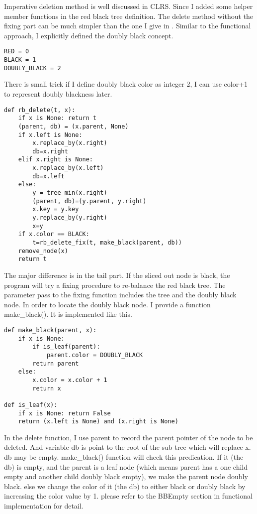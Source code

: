 \documentclass{article}
\begin{document}
Imperative deletion method is well discussed in CLRS. Since I added some helper member functions
in the red black tree definition. The delete method without the fixing part can be much simpler
than the one I give in \cite{bst-lxy}. Similar to the functional approach, I explicitly defined
the doubly black concept.

\lstset{language=Python}
\begin{lstlisting}
RED = 0
BLACK = 1
DOUBLY_BLACK = 2
\end{lstlisting}

There is small trick if I define doubly black color as integer 2, I can use color+1 to represent
doubly blackness later.

\lstset{language=Python}
\begin{lstlisting}
def rb_delete(t, x):
    if x is None: return t
    (parent, db) = (x.parent, None)
    if x.left is None:
        x.replace_by(x.right)
        db=x.right
    elif x.right is None:
        x.replace_by(x.left)
        db=x.left
    else:
        y = tree_min(x.right)
        (parent, db)=(y.parent, y.right)
        x.key = y.key
        y.replace_by(y.right)
        x=y
    if x.color == BLACK:
        t=rb_delete_fix(t, make_black(parent, db))
    remove_node(x)
    return t
\end{lstlisting}

The major difference is in the tail part. If the sliced out node is black, the program will
try a fixing procedure to re-balance the red black tree. The parameter pass to the fixing
function includes the tree and the doubly black node. In order to locate the doubly black
node. I provide a function make\_black(). It is implemented like this.

\begin{lstlisting}
def make_black(parent, x):
    if x is None:
        if is_leaf(parent):
            parent.color = DOUBLY_BLACK
        return parent
    else:
        x.color = x.color + 1
        return x

def is_leaf(x):
    if x is None: return False
    return (x.left is None) and (x.right is None)
\end{lstlisting}

In the delete function, I use parent to record the parent pointer of the node to be deleted. 
And variable db is point to the root of the sub tree which will replace x. db may be empty.
make\_black() function will check this predication. If it (the db) is empty, and the parent is a leaf
node (which means parent has a one child empty and another child doubly black empty), we make
the parent node doubly black. else we change the color of it (the db) to either black or doubly
black by increasing the color value by 1. please refer to the BBEmpty section in functional 
implementation for detail.
\end{document}
